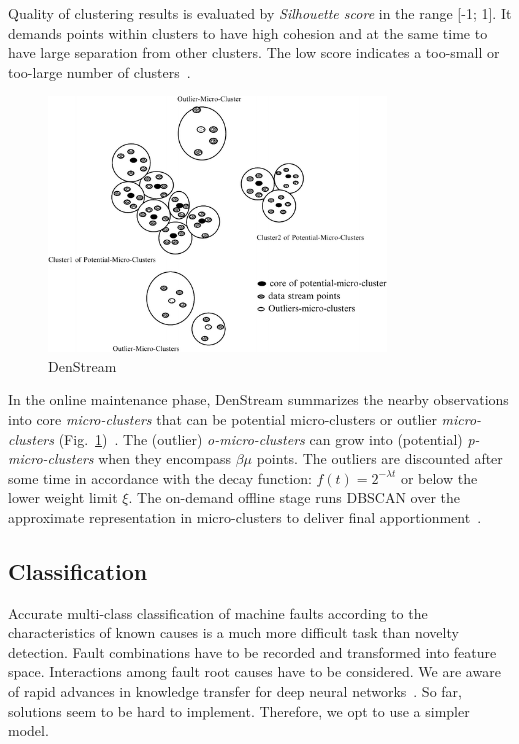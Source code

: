 Quality of clustering results is evaluated by \emph{Silhouette score} in the range [-1; 1]. It demands points within clusters to have high cohesion and at the same time to have large separation from other clusters. The low score indicates a too-small or too-large number of clusters~\cite{rousseeuw_rousseeuw_1987}. 

\begin{figure}[ht]
    \centering
    \includegraphics[width=0.8\textwidth]{assets/analysis/DenStream.png}
    \caption{DenStream~\cite{amini_density_2012}}
    \label{fig:denstream}
\end{figure}

In the online maintenance phase, DenStream summarizes the nearby observations into core \emph{micro-clusters} that can be potential micro-clusters or outlier \emph{micro-clusters} (Fig.~\ref{fig:denstream})~\cite{ghesmoune_state---art_2016}. The (outlier) \emph{o-micro-clusters} can grow into (potential) \emph{p-micro-clusters} when they encompass $\beta \mu$ points. The outliers are discounted after some time in accordance with the decay function: $f(t) = 2^{-\lambda t}$ or below the lower weight limit $\xi$. The on-demand offline stage runs DBSCAN over the approximate representation in micro-clusters to deliver final apportionment~\cite{cao_density-based_2006}.

\subsection{Classification}
Accurate multi-class classification of machine faults according to the characteristics of known causes is a much more difficult task than novelty detection. Fault combinations have to be recorded and transformed into feature space. Interactions among fault root causes have to be considered. We are aware of rapid advances in knowledge transfer for deep neural networks~\cite{maurya_condition-based_2021}. So far, solutions seem to be hard to implement. Therefore, we opt to use a simpler model.


